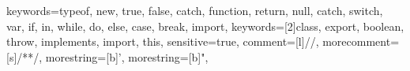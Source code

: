 {
    keywords={typeof, new, true, false, catch, function, return, null, catch, switch, var, if, in, while, do, else, 
    case, break, import},
    keywords=[2]{class, export, boolean, throw, implements, import, this},
    sensitive=true,
    comment=[l]{//},
    morecomment=[s]{/*}{*/},
    morestring=[b]',
    morestring=[b]",
}
